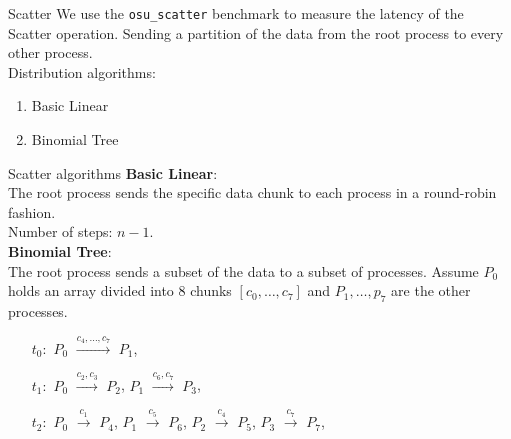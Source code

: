 %
%
\begin{frame}[fragile]{Scatter}
    We use the \texttt{osu\_scatter} benchmark to measure the latency
    of the Scatter operation. Sending a partition of the data from the
    root process to every other process. \\
    Distribution algorithms:
    \begin{enumerate}
        \item Basic Linear
        \item Binomial Tree
    \end{enumerate}
\end{frame}
\begin{frame}[fragile]{Scatter algorithms}
    \textbf{Basic Linear}: \\
    The root process sends the specific data chunk to each process
    in a round-robin fashion. \\
    Number of steps: $n-1$. \\
    \vspace*{.25cm}
    \textbf{Binomial Tree}: \\
    The root process sends a subset of the data to a subset of processes.
    Assume $P_0$ holds an array divided
    into $8$ chunks $[ c_0, \dots, c_7 ]$ and $P_1, \dots, p_7$ are
    the other processes.
    \begin{enumerate}
        \item[$t_0:$] $P_0$ $\xrightarrow{c_4,\dots,c_7}$ $P_1$,
        \item[$t_1:$] $P_0$ $\xrightarrow{c_2,c_3}$ $P_2$, $P_1$ $\xrightarrow{c_6,c_7}$ $P_3$,
        \item[$t_2:$] $P_0$ $\xrightarrow{c_1}$ $P_4$, $P_1$ $\xrightarrow{c_5}$ $P_6$, $P_2$ $\xrightarrow{c_4}$ $P_5$, $P_3$ $\xrightarrow{c_7}$ $P_7$,
    \end{enumerate}
\end{frame}
